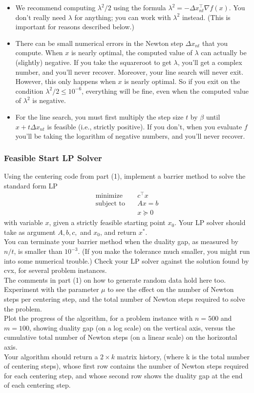 \begin{itemize}
    \item We recommend computing $\lambda^2/2$ using the formula $\lambda^2 = - \Delta x_{nt}^\top \nabla f(x)$. You don’t really need $\lambda$ for anything; you can work with $\lambda^2$ instead. (This is important for reasons described below.)
    \item There can be small numerical errors in the Newton step $\Delta x_{nt}$ that you compute. When $x$ is nearly optimal, the computed value of $\lambda$ can actually be (slightly) negative. If you take the squareroot to get $\lambda$, you’ll get a complex number, and you’ll never recover. Moreover, your line search will never exit. However, this only happens when $x$ is nearly optimal. So if you exit on the condition $\lambda^2/2 \leq 10^{-6}$, everything will be fine, even when the computed value of $\lambda^2$ is negative.
    \item For the line search, you must first multiply the step size $t$ by $\beta$ until $x + t \Delta x_{nt}$ is feasible (i.e., strictly positive). If you don’t, when you evaluate $f$ you’ll be taking the logarithm of negative numbers, and you’ll never recover.
\end{itemize}

\subsubsection{Feasible Start LP Solver}
Using the centering code from part (1),
implement a barrier method to solve the standard form LP
\begin{align}
    \text{minimize} & \quad c^\top x \\
    \text{subject to} & \quad Ax = b \\
    & \quad x \succeq 0
\end{align}
with variable $x$, given a strictly feasible starting point $x_0$. Your LP solver should
take as argument $A, b, c,$ and $x_0$, and return $x^*$. \\
You can terminate your barrier method when the duality gap, as measured by $n/t$,
is smaller than $10^{-3}$. (If you make the tolerance much smaller, you might run into
some numerical trouble.) Check your LP solver against the solution found by cvx, for
several problem instances. \\
The comments in part (1) on how to generate random data hold here too.
Experiment with the parameter $\mu$ to see the effect on the number of Newton steps per
centering step, and the total number of Newton steps required to solve the problem. \\
Plot the progress of the algorithm, for a problem instance with $n = 500$ and $m = 100$,
showing duality gap (on a log scale) on the vertical axis, versus the cumulative total
number of Newton steps (on a linear scale) on the horizontal axis. \\
Your algorithm should return a $2 \times k$ matrix history, (where k is the total number
of centering steps), whose first row contains the number of Newton steps required
for each centering step, and whose second row shows the duality gap at the end of
each centering step. 

